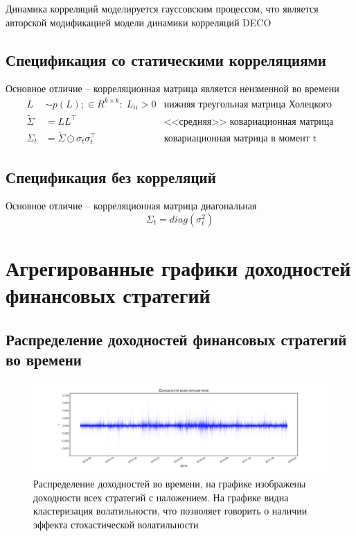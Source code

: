 \documentclass{article}
\begin{document}
Динамика корреляций моделируется гауссовским процессом, что является авторской модификацией модели динамики корреляций DECO
\subsection{Спецификация со статическими корреляциями}
Основное отличие -- корреляционная матрица является неизменной во времени
\begin{align}
L &\sim p(L);\in R^{k\times k}:\; L_{ii} > 0 & \text{нижняя треугольная матрица Холецкого}\nonumber\\
\tilde{\Sigma} &= LL^\top & \text{<<средняя>> ковариационная матрица}\nonumber\\
\Sigma_t &= \tilde{\Sigma} \odot \sigma_t\sigma_t^\top & \text{ковариационная матрица в момент t}\label{eq:staticcorr}
\end{align}

\subsection{Спецификация без корреляций}
Основное отличие -- корреляционная матрица диагональная
\begin{equation}
\Sigma_t = diag(\sigma^2_t)\label{eq:nocorr}
\end{equation}
\newpage
\section{Агрегированные графики доходностей финансовых стратегий}
\subsection{Распределение доходностей финансовых стратегий во времени}
\begin{figure}[h]
	\includegraphics[width=\linewidth]{returns-all}
	\caption{Распределение доходностей во времени, на графике изображены доходности всех стратегий с наложением. На графике видна кластеризация волатильности, что позволяет говорить о наличии эффекта стохастической волатильности}
\end{figure}
\end{document}
